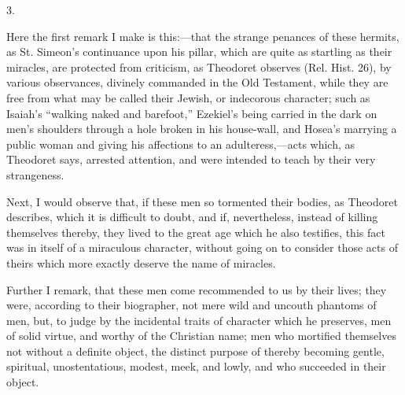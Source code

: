 3.

Here the first remark I make is this:—that the strange penances
of these hermits, as St. Simeon's continuance upon his pillar, which
are quite as startling as their miracles, are protected from
criticism, as Theodoret observes (Rel. Hist. 26), by various
observances, divinely commanded in the Old Testament, while they are
free from what may be called their Jewish, or indecorous character; such as Isaiah's ``walking naked and barefoot,''
Ezekiel's being carried in the dark on men's shoulders through a hole
broken in his house-wall, and Hosea's marrying a public woman and
giving his affections to an adulteress,—acts which, as Theodoret
says, arrested attention, and were intended to teach by their very
strangeness.

Next, I would observe that, if these men so tormented their bodies,
as Theodoret describes, which it is difficult to doubt, and if,
nevertheless, instead of killing themselves thereby, they lived to the
great age which he also testifies, this fact was in itself of a
miraculous character, without going on to consider those acts of
theirs which more exactly deserve the name of miracles.

Further I remark, that these men come recommended to us by their
lives; they were, according to their biographer, not mere wild and
uncouth phantoms of men, but, to judge by the incidental traits of
character which he preserves, men of solid virtue, and worthy of the
Christian name; men who mortified themselves not without a definite
object, the distinct purpose of thereby becoming gentle, spiritual,
unostentatious, modest, meek, and lowly, and who succeeded in their
object.

